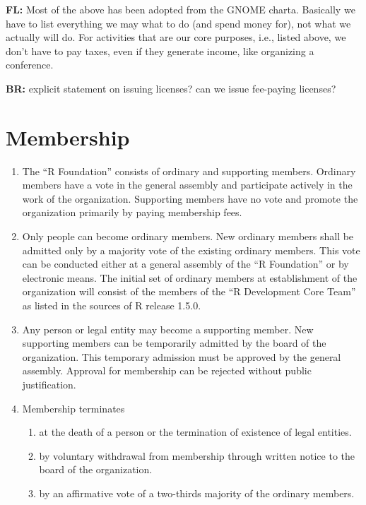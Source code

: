 \documentclass[a4paper]{article}
\newcommand{\note}[2]{{\it \par\noindent\textbf{#1:} #2}}
\begin{document}
\note{FL}{Most of the above has been adopted from the GNOME charta.
  Basically we have to list everything we may what to do (and spend
  money for), not what we actually will do. For activities that are
  our core purposes, i.e., listed above, we don't have to pay taxes,
  even if they generate income, like organizing a conference.}

\note{BR}{explicit statement on issuing licenses? can we issue
  fee-paying licenses?}

\section{Membership}

\begin{enumerate}
 \item The ``R Foundation'' consists of ordinary and supporting
  members.  Ordinary members have a vote in the general assembly and
  participate actively in the work of the organization. Supporting
  members have no vote and promote the organization primarily by
  paying membership fees.
  
 \item Only people can become ordinary members. New ordinary
  members shall be admitted only by a majority vote of the existing
  ordinary members. This vote can be conducted either at a general
  assembly of the ``R Foundation'' or by electronic means.  The
  initial set of ordinary members at establishment of the organization
  will consist of the members of the ``R Development Core Team'' as
  listed in the sources of R release 1.5.0.
  
 \item Any person or legal entity may become a supporting member.  New
  supporting members can be temporarily admitted by the board of the
  organization.  This temporary admission must be approved by the
  general assembly.  Approval for membership can be rejected without
  public justification.

 \item Membership terminates
  \begin{enumerate}
   \item at the death of a person or the termination of
    existence of legal entities.
   \item by voluntary withdrawal from membership through written
    notice to the board of the organization.
   \item by an affirmative vote of a two-thirds majority of the
    ordinary members. 
  \end{enumerate}
  
\end{enumerate}
   
\end{document}
